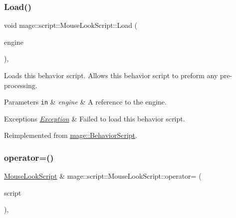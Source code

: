 \mbox{\label{classmage_1_1script_1_1_mouse_look_script_a00c8dc8ebaf67da13bd0bc45de3ad8b6}} 
\subsubsection{\texorpdfstring{Load()}{Load()}}
{\footnotesize\ttfamily void mage\+::script\+::\+Mouse\+Look\+Script\+::\+Load (\begin{DoxyParamCaption}\item[{\mbox{[}\mbox{[}maybe\+\_\+unused\mbox{]} \mbox{]} \mbox{\hyperlink{classmage_1_1_engine}{Engine}} \&}]{engine }\end{DoxyParamCaption})\hspace{0.3cm}{\ttfamily [override]}, {\ttfamily [virtual]}}

Loads this behavior script. Allows this behavior script to preform any pre-\/processing.


\begin{DoxyParams}[1]{Parameters}
\mbox{\tt in}  & {\em engine} & A reference to the engine. \\
\hline
\end{DoxyParams}

\begin{DoxyExceptions}{Exceptions}
{\em \mbox{\hyperlink{classmage_1_1_exception}{Exception}}} & Failed to load this behavior script. \\
\hline
\end{DoxyExceptions}


Reimplemented from \mbox{\hyperlink{classmage_1_1_behavior_script_ae7864876b2ffb1d1d8d8a56e3099f1f2}{mage\+::\+Behavior\+Script}}.

\mbox{\label{classmage_1_1script_1_1_mouse_look_script_a08731370926cbaee931170fd3fb108e6}} 
\subsubsection{\texorpdfstring{operator=()}{operator=()}\hspace{0.1cm}{\footnotesize\ttfamily [1/2]}}
{\footnotesize\ttfamily \mbox{\hyperlink{classmage_1_1script_1_1_mouse_look_script}{Mouse\+Look\+Script}} \& mage\+::script\+::\+Mouse\+Look\+Script\+::operator= (\begin{DoxyParamCaption}\item[{const \mbox{\hyperlink{classmage_1_1script_1_1_mouse_look_script}{Mouse\+Look\+Script}} \&}]{script }\end{DoxyParamCaption})\hspace{0.3cm}{\ttfamily [default]}, {\ttfamily [noexcept]}}

